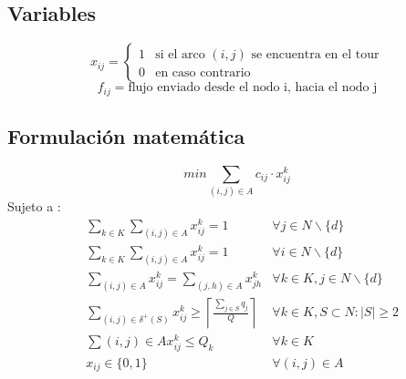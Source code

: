 \documentclass{article}
\numberwithin{equation}{section}
\begin{document}
\subsection{Variables}
\begin{flushleft}
\[x_{ij}={\begin{cases}1&{\mbox{si el arco $(i,j)$ se encuentra en el tour}}\\0&{\mbox{en caso contrario}}\end{cases}}
\]
\[f_{ij} = \mbox{flujo enviado desde el nodo i, hacia el nodo j}\]
\end{flushleft}
\subsection{Formulación matemática}
\begin{equation}
min \sum_{(i,j) \in A} c_{ij} \cdot x_{ij}^{k}
\end{equation}
Sujeto a : \begin{align}
& \sum_{k \in K} \sum_{(i,j) \in A} x_{ij}^{k} = 1 &\forall j \in N\backslash \{d\} \\
& \sum_{k \in K} \sum_{(i,j) \in A} x_{ij}^{k} = 1 &\forall i \in N\backslash \{d\} \\
& \sum_{(i,j) \in A} x_{ij}^{k} = \sum_{(j,h) \in A} x_{jh}^{k} &\forall k \in K, j \in N \backslash \{d\} \\
& \sum_{(i,j) \in \delta^{+}(S)} x_{ij}^{k} \geq \left\lceil \frac{\sum\limits_{j \in S} q_{j}}{Q} \right\rceil &\forall k \in K, S \subset N : |S| \geq 2 \\
& \sum{(i,j) \in A} x_{ij}^{k} \leq Q_{k} & \forall k \in K\\
& x_{ij} \in \{0,1\} &\forall (i,j) \in A
\end{align}
\end{document}
